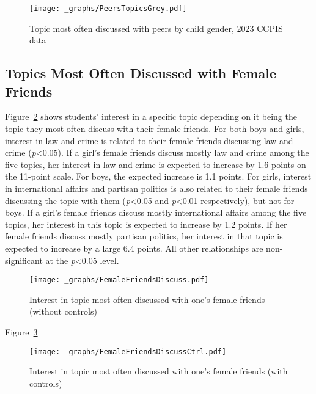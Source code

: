 \documentclass[
  letterpaper,
  DIV=11,
  numbers=noendperiod]{scrreprt}
\begin{document}
\begin{figure}

{\centering \texttt{[image: \_graphs/PeersTopicsGrey.pdf]}

}

\caption{\label{fig-peers-topics}Topic most often discussed with peers
by child gender, 2023 CCPIS data}

\end{figure}

\hypertarget{topics-most-often-discussed-with-female-friends}{%
\subsection{Topics Most Often Discussed with Female
Friends}\label{topics-most-often-discussed-with-female-friends}}

Figure~\ref{fig-femalefriends} shows students' interest in a specific
topic depending on it being the topic they most often discuss with their
female friends. For both boys and girls, interest in law and crime is
related to their female friends discussing law and crime
(\emph{p}\textless0.05). If a girl's female friends discuss mostly law
and crime among the five topics, her interest in law and crime is
expected to increase by 1.6 points on the 11-point scale. For boys, the
expected increase is 1.1 points. For girls, interest in international
affairs and partisan politics is also related to their female friends
discussing the topic with them (\emph{p}\textless0.05 and
\emph{p}\textless0.01 respectively), but not for boys. If a girl's
female friends discuss mostly international affairs among the five
topics, her interest in this topic is expected to increase by 1.2
points. If her female friends discuss mostly partisan politics, her
interest in that topic is expected to increase by a large 6.4 points.
All other relationships are non-significant at the \emph{p}\textless0.05
level.

\begin{figure}

{\centering \texttt{[image: \_graphs/FemaleFriendsDiscuss.pdf]}

}

\caption{\label{fig-femalefriends}Interest in topic most often discussed
with one's female friends (without controls)}

\end{figure}

Figure~\ref{fig-femalefriendsctrl}

\begin{figure}

{\centering \texttt{[image: \_graphs/FemaleFriendsDiscussCtrl.pdf]}

}

\caption{\label{fig-femalefriendsctrl}Interest in topic most often
discussed with one's female friends (with controls)}

\end{figure}
\end{document}
